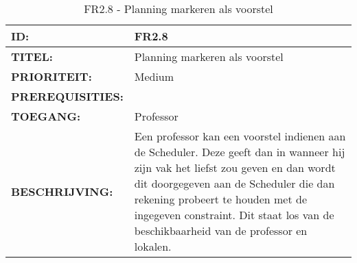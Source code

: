         
\noindent\begin{table}[H]
            \begin{tabular}{l | p{10cm}}
                \textbf{ID:} & FR2.8 \\ \hline
                \textbf{TITEL:} & Planning markeren als voorstel\\ \hline
                \textbf{PRIORITEIT:} &  Medium \\ \hline
                \textbf{PREREQUISITIES:} & \\ \hline
                \textbf{TOEGANG:} & Professor \\ \hline
                \textbf{BESCHRIJVING:} & Een professor kan een voorstel indienen aan de Scheduler. 
                                        Deze geeft dan in wanneer hij zijn vak het liefst zou geven en dan wordt dit doorgegeven aan de Scheduler die dan rekening probeert te houden met de ingegeven constraint. Dit staat los van de beschikbaarheid van de professor en lokalen.  \\
            \end{tabular}\\
            \caption{FR2.8 - Planning markeren als voorstel}
            \label{tab:FR2.8 - Planning markeren als voorstel}
        \end{table}
        
